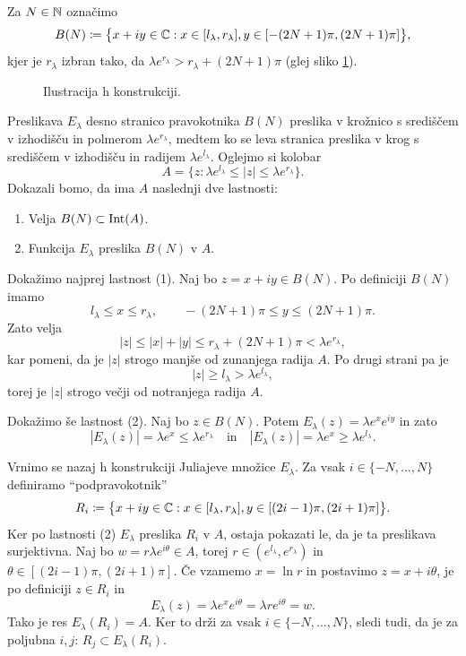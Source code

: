 Za \(N \in \mathbb N\) označimo
\[B(N) \coloneq \bigl\{ x + iy \in \mathbb C : x \in [l_\lambda, r_\lambda], y \in [- (2N + 1) \pi, (2N + 1) \pi] \bigr\},\]
kjer je \(r_\lambda\) izbran tako, da \(\lambda e^{r_\lambda} > r_\lambda + (2N + 1) \pi\) (glej sliko \ref{fig:konstrukcija}).
\begin{figure}%
    \centering
    
    \caption{Ilustracija h konstrukciji.}
    \label{fig:konstrukcija}
\end{figure}
Preslikava \(E_\lambda\) desno stranico pravokotnika \(B (N)\) preslika v krožnico s središčem v izhodišču in polmerom \(\lambda e^{r_\lambda}\), medtem ko se leva stranica preslika v krog s središčem v izhodišču in radijem \(\lambda e^{l_\lambda}\). Oglejmo si kolobar
\[A = \{z : \lambda e^{l_\lambda} \leq |z| \leq \lambda e^{r_\lambda}\}.\]
Dokazali bomo, da ima \(A\) naslednji dve lastnosti:

\begin{enumerate}[label=(\arabic*)]
    \item Velja \(B (N) \subset \operatorname{Int} (A)\).
    \item Funkcija \(E_\lambda\) preslika \(B (N)\) v \(A\).
\end{enumerate}

\noindent Dokažimo najprej lastnost (1). Naj bo \(z = x + i y \in B (N)\). Po definiciji \(B (N)\) imamo
\[l_\lambda \leq x \leq r_\lambda, \qquad - (2N + 1) \pi \leq y \leq (2N + 1) \pi.\]
Zato velja
\[|z| \leq |x| + |y| \leq r_\lambda + (2N + 1) \pi < \lambda e^{r_\lambda},\]
kar pomeni, da je \(|z|\) strogo manjše od zunanjega radija \(A\). Po drugi strani pa je
\[|z| \geq l_\lambda > \lambda e^{l_\lambda},\]
torej je \(|z|\) strogo večji od notranjega radija \(A\).

Dokažimo še lastnost (2). Naj bo \(z \in B (N)\). Potem \(E_\lambda (z) = \lambda e^x e^{i y}\) in zato
\[|E_\lambda (z)| = \lambda e^x \leq \lambda e^{r_\lambda} \quad \text{in} \quad |E_\lambda (z)| = \lambda e^x \geq \lambda e^{l_\lambda}.\]

Vrnimo se nazaj h konstrukciji Juliajeve množice \(E_\lambda\). Za vsak \(i \in \{ -N, \dots, N \}\) definiramo ``podpravokotnik''
\[R_i \coloneq \bigl\{ x + iy \in \mathbb C : x \in [l_\lambda, r_\lambda], y \in [(2i - 1) \pi, (2i + 1) \pi] \bigr\}.\]
Ker po lastnosti (2) \(E_\lambda\) preslika \(R_i\) v \(A\), ostaja pokazati le, da je ta preslikava surjektivna. Naj bo \(w = r \lambda e^{i \theta} \in A\), torej \(r \in (e^{l_\lambda}, e^{r_\lambda})\) in \(\theta \in [(2i - 1) \pi, (2i + 1) \pi]\). Če vzamemo \(x = \ln r\) in postavimo \(z = x + i \theta\), je po definiciji \(z \in R_i\) in
\[E_\lambda (z) = \lambda e^x e^{i \theta} = \lambda r e^{i \theta} = w.\]
Tako je res \(E_\lambda (R_i) = A\). Ker to drži za vsak \(i \in \{ -N, \dots, N \}\), sledi tudi, da je za poljubna \(i, j\): \(R_j \subset E_\lambda (R_i)\).


